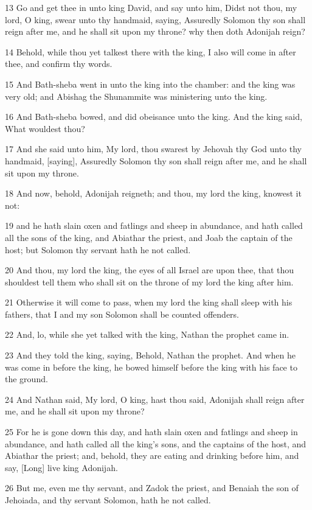 \par 13 Go and get thee in unto king David, and say unto him, Didst not thou, my lord, O king, swear unto thy handmaid, saying, Assuredly Solomon thy son shall reign after me, and he shall sit upon my throne? why then doth Adonijah reign?
\par 14 Behold, while thou yet talkest there with the king, I also will come in after thee, and confirm thy words.
\par 15 And Bath-sheba went in unto the king into the chamber: and the king was very old; and Abishag the Shunammite was ministering unto the king.
\par 16 And Bath-sheba bowed, and did obeisance unto the king. And the king said, What wouldest thou?
\par 17 And she said unto him, My lord, thou swarest by Jehovah thy God unto thy handmaid, [saying], Assuredly Solomon thy son shall reign after me, and he shall sit upon my throne.
\par 18 And now, behold, Adonijah reigneth; and thou, my lord the king, knowest it not:
\par 19 and he hath slain oxen and fatlings and sheep in abundance, and hath called all the sons of the king, and Abiathar the priest, and Joab the captain of the host; but Solomon thy servant hath he not called.
\par 20 And thou, my lord the king, the eyes of all Israel are upon thee, that thou shouldest tell them who shall sit on the throne of my lord the king after him.
\par 21 Otherwise it will come to pass, when my lord the king shall sleep with his fathers, that I and my son Solomon shall be counted offenders.
\par 22 And, lo, while she yet talked with the king, Nathan the prophet came in.
\par 23 And they told the king, saying, Behold, Nathan the prophet. And when he was come in before the king, he bowed himself before the king with his face to the ground.
\par 24 And Nathan said, My lord, O king, hast thou said, Adonijah shall reign after me, and he shall sit upon my throne?
\par 25 For he is gone down this day, and hath slain oxen and fatlings and sheep in abundance, and hath called all the king's sons, and the captains of the host, and Abiathar the priest; and, behold, they are eating and drinking before him, and say, [Long] live king Adonijah.
\par 26 But me, even me thy servant, and Zadok the priest, and Benaiah the son of Jehoiada, and thy servant Solomon, hath he not called.
